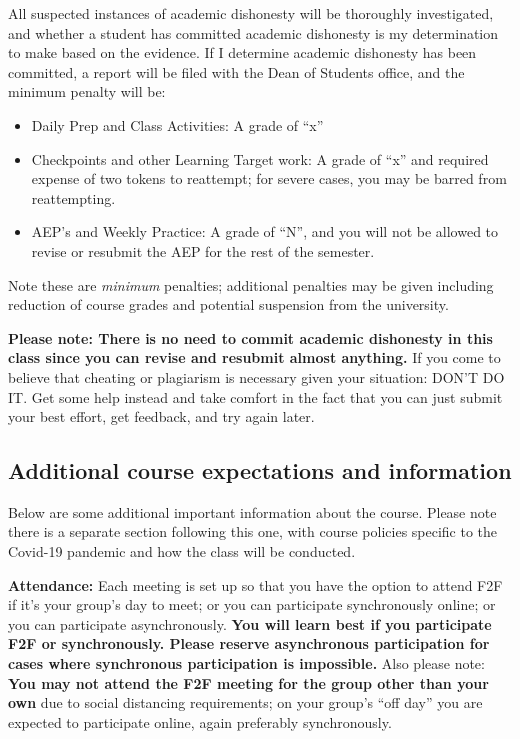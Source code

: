 \documentclass[]{article}
\providecommand{\tightlist}{%
  \setlength{\itemsep}{0pt}\setlength{\parskip}{0pt}}
\begin{document}
All suspected instances of academic dishonesty will be thoroughly
investigated, and whether a student has committed academic dishonesty is
my determination to make based on the evidence. If I determine academic
dishonesty has been committed, a report will be filed with the Dean of
Students office, and the minimum penalty will be:

\begin{itemize}
\tightlist
\item
  Daily Prep and Class Activities: A grade of ``x''
\item
  Checkpoints and other Learning Target work: A grade of ``x'' and
  required expense of two tokens to reattempt; for severe cases, you may
  be barred from reattempting.
\item
  AEP's and Weekly Practice: A grade of ``N'', and you will not be
  allowed to revise or resubmit the AEP for the rest of the semester.
\end{itemize}

Note these are \emph{minimum} penalties; additional penalties may be
given including reduction of course grades and potential suspension from
the university.

\textbf{Please note: There is no need to commit academic dishonesty in
this class since you can revise and resubmit almost anything.} If you
come to believe that cheating or plagiarism is necessary given your
situation: DON'T DO IT. Get some help instead and take comfort in the
fact that you can just submit your best effort, get feedback, and try
again later.

\hypertarget{additional-course-expectations-and-information}{%
\subsection{Additional course expectations and
information}\label{additional-course-expectations-and-information}}

Below are some additional important information about the course. Please
note there is a separate section following this one, with course
policies specific to the Covid-19 pandemic and how the class will be
conducted.

\textbf{Attendance:} Each meeting is set up so that you have the option
to attend F2F if it's your group's day to meet; or you can participate
synchronously online; or you can participate asynchronously. \textbf{You
will learn best if you participate F2F or synchronously. Please reserve
asynchronous participation for cases where synchronous participation is
impossible.} Also please note: \textbf{You may not attend the F2F
meeting for the group other than your own} due to social distancing
requirements; on your group's ``off day'' you are expected to
participate online, again preferably synchronously.
\end{document}

